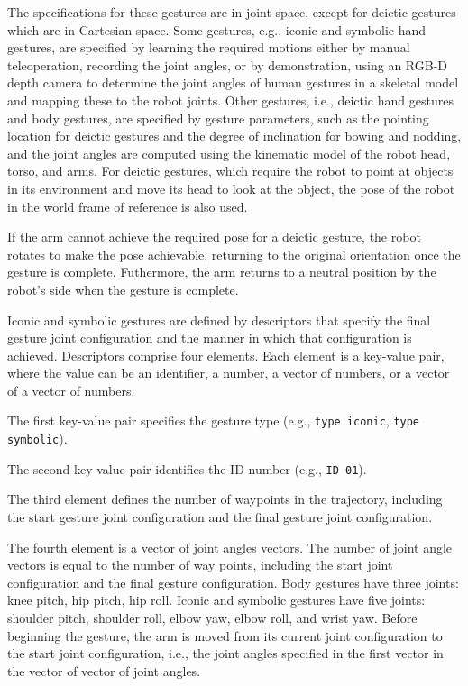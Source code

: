 \documentclass{CSSRforAfrica}
\begin{document}
{The specifications for these gestures are in joint space, except for deictic gestures which are  in Cartesian space.  Some gestures, e.g., iconic and symbolic hand gestures, are specified by learning the required motions either by manual teleoperation, recording the joint angles, or by demonstration,  using an RGB-D depth camera to determine the joint angles of human gestures in a skeletal model  and mapping  these to the robot joints. Other gestures, i.e., deictic hand gestures and body gestures, are specified by gesture parameters, such as the pointing location for deictic gestures and the degree of inclination for bowing and nodding, and the joint angles are computed using the kinematic model of the robot head, torso, and arms. For deictic gestures, which require the robot to point at objects in its environment and move its head to look at the object, the pose of the robot in the world frame of reference is also used.
 
If the arm cannot achieve the required pose for a deictic gesture, the robot  rotates to make the pose achievable, returning to the original orientation once the gesture is complete.  Futhermore, the arm  returns to a neutral position by the robot's side when the gesture is complete.

Iconic and symbolic gestures are defined by descriptors that specify the final gesture joint configuration and the manner in which that configuration is achieved.  
Descriptors comprise four elements. Each element is a key-value pair, where the value can be an identifier, a number, a vector of numbers, or a vector of a vector of numbers. 

The first key-value pair  specifies  the gesture type (e.g., {\small \verb+type iconic+}, {\small \verb+type symbolic+}).  

The second key-value pair  identifies the  ID number (e.g., {\small \verb+ID 01+}).

The third element defines the number of waypoints in the trajectory, including the start gesture joint configuration and  the final gesture joint configuration.  

The fourth element is a vector of joint angles vectors. The number of joint angle vectors is equal to the number of way points, including the start joint configuration and the final gesture configuration.  Body gestures have three joints: knee pitch, hip pitch, hip roll. Iconic and symbolic gestures have five joints: shoulder pitch, shoulder roll, elbow yaw, elbow roll, and wrist yaw. Before beginning the gesture, the arm is moved from its current joint configuration to the start joint configuration, i.e., the joint angles specified in the first vector in the vector of vector of joint angles.  

}
\end{document}
